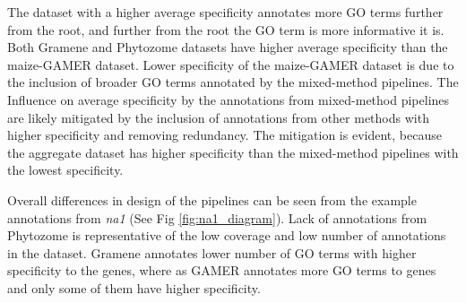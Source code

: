 The dataset with a higher average specificity annotates more GO terms further from the root, and further from the root the GO term is more informative it is. Both Gramene and Phytozome datasets have higher average specificity than the maize-GAMER dataset. Lower specificity of the maize-GAMER dataset is due to the inclusion of broader GO terms annotated by the mixed-method pipelines. The Influence on average specificity by the annotations from mixed-method pipelines are likely mitigated by the inclusion of annotations from other methods with higher specificity and removing redundancy. The mitigation is evident, because the aggregate dataset has higher specificity than the mixed-method pipelines with the lowest specificity. 

Overall differences in design of the pipelines can be seen from the example annotations from \textit{na1} (See Fig \ref{fig:na1_diagram}). Lack of annotations from Phytozome is representative of the low coverage and low number of annotations in the dataset. Gramene annotates lower number of GO terms with higher specificity to the genes, where as GAMER annotates more GO terms to genes and only some of them have higher specificity. 



